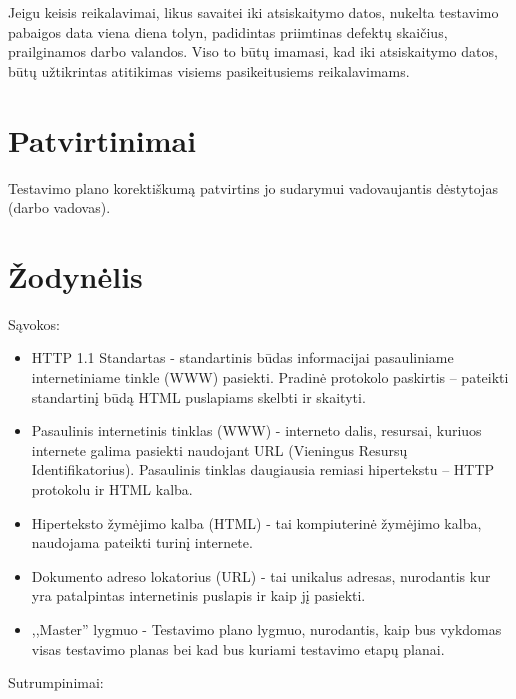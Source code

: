 \documentclass{VUMIFPSkursinis}
\begin{document}
    Jeigu keisis reikalavimai, likus savaitei iki atsiskaitymo datos, nukelta testavimo pabaigos data viena diena tolyn, padidintas priimtinas defektų skaičius, prailginamos darbo valandos. Viso to būtų imamasi, kad iki atsiskaitymo datos, būtų užtikrintas atitikimas visiems pasikeitusiems reikalavimams.

    \section{Patvirtinimai}

    Testavimo plano korektiškumą patvirtins jo sudarymui vadovaujantis dėstytojas (darbo vadovas).

    \section{Žodynėlis}

    Sąvokos:

    \begin{itemize}
    	\item HTTP 1.1 Standartas - standartinis būdas informacijai pasauliniame internetiniame tinkle (WWW) pasiekti. 
    		  Pradinė protokolo paskirtis – pateikti standartinį būdą HTML puslapiams skelbti ir skaityti.
    	\item Pasaulinis internetinis tinklas (WWW) - interneto dalis, resursai, kuriuos internete galima pasiekti naudojant URL (Vieningus Resursų Identifikatorius).
    		  Pasaulinis tinklas daugiausia remiasi hipertekstu – HTTP protokolu ir HTML kalba.
    	\item Hiperteksto žymėjimo kalba (HTML) - tai kompiuterinė žymėjimo kalba, naudojama pateikti turinį internete.
    	\item Dokumento adreso lokatorius (URL) - tai unikalus adresas, nurodantis kur yra patalpintas internetinis puslapis ir kaip jį pasiekti.
    	\item ,,Master'' lygmuo - Testavimo plano lygmuo, nurodantis, kaip bus vykdomas visas testavimo planas bei kad bus kuriami testavimo etapų planai.
    
    \end{itemize}

    Sutrumpinimai:
\end{document}
